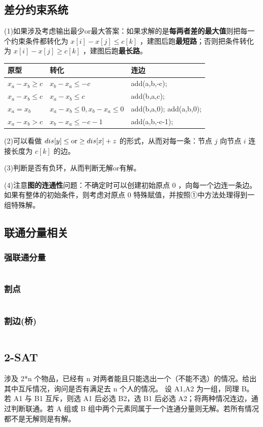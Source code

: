 \documentclass[a4paper,11pt]{article}
\begin{document}
\subsection{差分约束系统}
(1)如果涉及考虑输出最少or最大答案：如果求解的是\textbf{每两者差的最大值}则把每一个约束条件都转化为
\(x[i]-x[j]\le c[k]\) ，建图后跑\textbf{最短路}；否则把条件转化为
\(x[i]-x[j]\ge c[k]\) ，建图后跑\textbf{最长路}。

\begin{longtable}[]{@{}lll@{}}
\toprule
原型 & 转化 & 连边\tabularnewline
\midrule
\endhead
\(x_a-x_b\ge c\) & \(x_b-x_a\le -c\) & add(a,b,-c);\tabularnewline
\(x_a-x_b\le c\) & \(x_a-x_b\le c\) & add(b,a,c);\tabularnewline
\(x_a=x_b\) & \(x_a-x_b\le 0,x_b-x_a\le 0\) & add(b,a,0);
add(a,b,0);\tabularnewline
\(x_a-x_b>c\) & \(x_b-x_a\le -c-1\) & add(a,b,-c-1);\tabularnewline
\bottomrule
\end{longtable}

(2)可以看做 \(dis[y]\le {\rm or} \ge dis[x]+z\) 的形式，从而对每一条：节点
\(j\) 向节点 \(i\) 连接长度为 \(c[k]\) 的边。

(3)判断是否有负环，从而判断无解or有解。

(4)注意\textbf{图的连通性}问题：不确定时可以创建初始原点 \(0\)
，向每一个边连一条边。如果有整体的初始条件，则考虑对原点 \(0\)
特殊赋值，并按照①中方法处理得到一组特殊解。
\subsection{联通分量相关}
\subsubsection{强联通分量}
\inputminted[linenos]{c++}{graph/tarjanscc.cpp}
\subsubsection{割点}
\inputminted[linenos]{c++}{graph/tarjanpoint.cpp}
\subsubsection{割边(桥)}
\inputminted[linenos]{c++}{graph/tarjanedge.cpp}
\subsection{2-SAT}
涉及 2*n 个物品，已经有 n 对两者能且只能选出一个（不能不选）的情况。给出其中互斥情况，询问是否有满足去 n 个人的情况。
设 A1,A2 为一组，同理 B。若 A1 与 B1 互斥，则选 A1 后必选 B2，选 B1 后必选 A2；将两种情况连边，通过判断联通。若 A 组或 B 组中两个元素同属于一个连通分量则无解。若所有情况都不是无解则是有解。
\inputminted[linenos]{c++}{graph/twosat.cpp}
\end{document}
